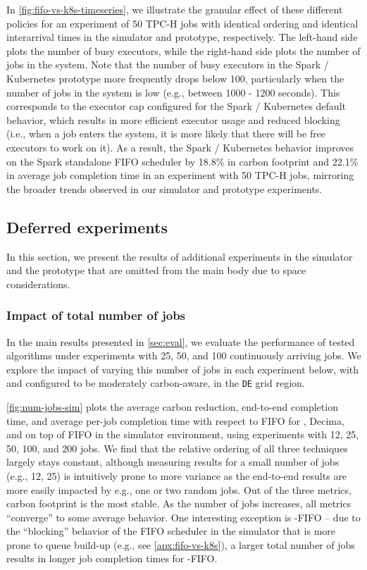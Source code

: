 In \autoref{fig:fifo-vs-k8s-timeseries}, we illustrate the granular effect of these different policies for an experiment of 50 TPC-H jobs with identical ordering and identical interarrival times in the simulator and prototype, respectively.  The left-hand side plots the number of busy executors, while the right-hand side plots the number of jobs in the system.  Note that the number of busy executors in the Spark / Kubernetes prototype more frequently drops below 100, particularly when the number of jobs in the system is low (e.g., between 1000 - 1200 seconds).  This corresponds to the executor cap configured for the Spark / Kubernetes default behavior, which results in more efficient executor usage and reduced blocking (i.e., when a job enters the system, it is more likely that there will be free executors to work on it).  As a result, the Spark / Kubernetes behavior improves on the Spark standalone FIFO scheduler by 18.8\% in carbon footprint and 22.1\% in average job completion time in an experiment with 50 TPC-H jobs, mirroring the broader trends observed in our simulator and prototype experiments.  


\subsection{Deferred experiments} \label{apx:exp}

In this section, we present the results of additional experiments in the simulator and the prototype that are omitted from the main body due to space considerations.


\subsubsection{\textbf{Impact of total number of jobs}}

In the main results presented in \autoref{sec:eval}, we evaluate the performance of tested algorithms under experiments with 25, 50, and 100 continuously arriving jobs.  We explore the impact of varying this number of jobs in each experiment below, with \DANISH and \CAP configured to be moderately carbon-aware, in the \verb|DE| grid region.

\autoref{fig:num-jobs-sim} plots the average carbon reduction, end-to-end completion time, and average per-job completion time with respect to FIFO for \DANISH, Decima, and \CAP on top of FIFO in the simulator environment, using experiments with 12, 25, 50, 100, and 200 jobs.  We find that the relative ordering of all three techniques largely stays constant, although measuring results for a small number of jobs (e.g., 12, 25) is intuitively prone to more variance as the end-to-end results are more easily impacted by e.g., one or two random jobs.  Out of the three metrics, carbon footprint is the most stable.  As the number of jobs increases, all metrics ``converge'' to some average behavior.  One interesting exception is \CAP-FIFO -- due to the ``blocking'' behavior of the FIFO scheduler in the simulator that is more prone to queue build-up (e.g., see \autoref{apx:fifo-vs-k8s}), a larger total number of jobs results in longer job completion times for \CAP-FIFO.


